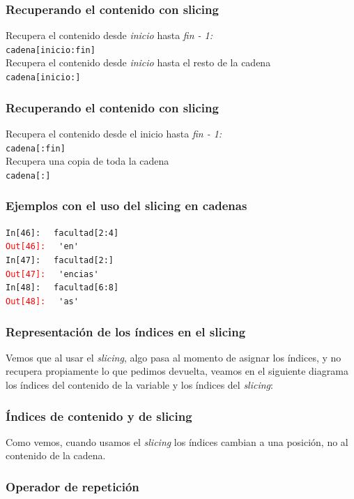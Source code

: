 {\begin{frame}[fragile]
\frametitle{Recuperando el contenido con slicing}
Recupera el contenido desde \emph{inicio} hasta \emph{fin - 1:}
\\
\bigskip
\verb|cadena[inicio:fin]|
\\
\bigskip
\pause
Recupera el contenido desde \emph{inicio} hasta el resto de la cadena
\\
\bigskip
\verb|cadena[inicio:]|
\end{frame}
\begin{frame}[fragile]
\frametitle{Recuperando el contenido con slicing}
Recupera el contenido desde el inicio hasta \emph{fin - 1:}
\\
\bigskip
\verb|cadena[:fin]|
\\
\bigskip
\pause
Recupera una copia de toda la cadena
\\
\bigskip
\verb|cadena[:]|
\end{frame}
\begin{frame}[fragile]
\frametitle{Ejemplos con el uso del slicing en cadenas}
\textcolor{ao}{\texttt{In[46]: }} \verb| facultad[2:4]|
\\
\pause
\textcolor{red}{\texttt{Out[46]: }} \verb| 'en'|
\\
\bigskip
\pause
\textcolor{ao}{\texttt{In[47]: }} \verb| facultad[2:]|
\\
\pause
\textcolor{red}{\texttt{Out[47]: }} \verb| 'encias'|
\pause
\\
\bigskip
\pause
\textcolor{ao}{\texttt{In[48]: }} \verb| facultad[6:8]|
\\
\pause
\textcolor{red}{\texttt{Out[48]: }} \verb| 'as'|
\end{frame}
\begin{frame}[fragile]
\frametitle{Representación de los índices en el slicing}
Vemos que al usar el \emph{slicing}, algo pasa al momento de asignar los índices, y no recupera propiamente lo que pedimos devuelta, veamos en el siguiente diagrama los índices del contenido de la variable y los índices del \emph{slicing}:
\end{frame}
\begin{frame}[fragile]
\frametitle{Índices de contenido y de slicing}
\begin{figure}
	
\end{figure}
Como vemos, cuando usamos el \emph{slicing} los índices cambian a una posición, no al contenido de la cadena.
\end{frame}
\begin{frame}[fragile]
\frametitle{Operador de repetición}

\end{frame}}
